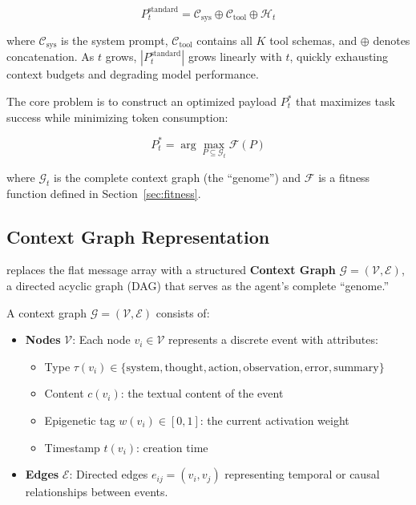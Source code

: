 \begin{equation}
    P_t^{\text{standard}} = \mathcal{C}_{\text{sys}} \oplus \mathcal{C}_{\text{tool}} \oplus \mathcal{H}_t
\end{equation}

where $\mathcal{C}_{\text{sys}}$ is the system prompt, $\mathcal{C}_{\text{tool}}$ contains all $K$ tool schemas, and $\oplus$ denotes concatenation. As $t$ grows, $|P_t^{\text{standard}}|$ grows linearly with $t$, quickly exhausting context budgets and degrading model performance.

The core problem is to construct an optimized payload $P_t^*$ that maximizes task success while minimizing token consumption:

\begin{equation}
    P_t^* = \arg\max_{P \subseteq \mathcal{G}_t} \mathcal{F}(P)
\end{equation}

where $\mathcal{G}_t$ is the complete context graph (the ``genome'') and $\mathcal{F}$ is a fitness function defined in Section~\ref{sec:fitness}.

\subsection{Context Graph Representation}
\label{sec:graph}

\EpiContext{} replaces the flat message array with a structured \textbf{Context Graph} $\mathcal{G} = (\mathcal{V}, \mathcal{E})$, a directed acyclic graph (DAG) that serves as the agent's complete ``genome.''

\begin{definition}
A context graph $\mathcal{G} = (\mathcal{V}, \mathcal{E})$ consists of:
\begin{itemize}
    \item \textbf{Nodes} $\mathcal{V}$: Each node $v_i \in \mathcal{V}$ represents a discrete event with attributes:
    \begin{itemize}
        \item Type $\tau(v_i) \in \{\text{system}, \text{thought}, \text{action}, \text{observation}, \text{error}, \text{summary}\}$
        \item Content $c(v_i)$: the textual content of the event
        \item Epigenetic tag $w(v_i) \in [0, 1]$: the current activation weight
        \item Timestamp $t(v_i)$: creation time
    \end{itemize}
    \item \textbf{Edges} $\mathcal{E}$: Directed edges $e_{ij} = (v_i, v_j)$ representing temporal or causal relationships between events.
\end{itemize}
\end{definition}


